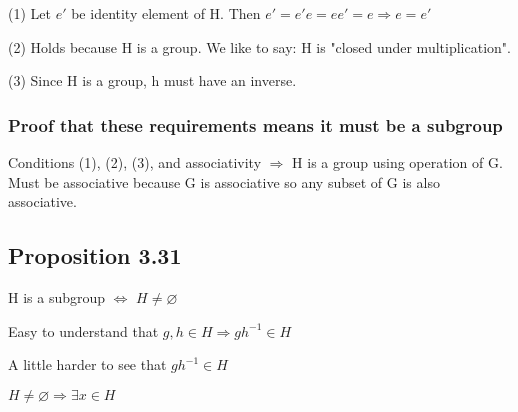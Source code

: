 \documentclass[class=scrartcl, crop=false]{standalone}
\begin{document}
(1) Let $e'$ be identity element of H. Then $e' = e'e = ee' =  e \Rightarrow e = e'$

(2) Holds because H is a group. We like to say: H is "closed under multiplication".

(3) Since H is a  group, h must have an inverse.

\subsubsection{Proof that these requirements means it must be a subgroup}

Conditions (1), (2), (3), and associativity $\Rightarrow$ H is a group using operation of G. Must be associative because G is associative so any subset of G is also associative. 

\subsection{Proposition 3.31}

H is a subgroup $\Leftrightarrow$ $H \neq \varnothing$

Easy to understand that  $g, h \in H \Rightarrow gh^{-1} \in H$

A little harder to see that $gh^{-1} \in H $

$H \neq \varnothing \Rightarrow \exists x \in H $
\end{document}
